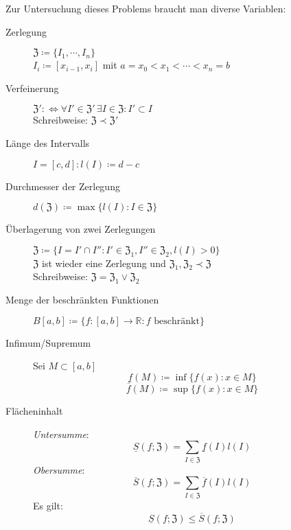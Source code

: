 \documentclass[ngerman,titlepage,twoside, parskip=half*]{scrreprt}
\newcommand*{\R}{\mathbb{R}}
\newcommand*{\ZZ}{\mathfrak{Z}}
\newcommand*{\perdef}{:\Leftrightarrow}
\theoremstyle{plain}
\theoremstyle{definition}
\theoremstyle{remark}
\begin{document}
Zur Untersuchung dieses Problems braucht man diverse Variablen:
\begin{description}
  \item[Zerlegung] $\ZZ\coloneqq\{I_1,\cdots,I_n\}$\\
    $I_i\coloneqq[x_{i-1},x_i]$ mit $a=x_0<x_1<\cdots<x_n=b$
  \item[Verfeinerung] $\ZZ'\perdef\forall
    I'\in\ZZ'\,\exists I\in\ZZ\colon I'\subset I$\\
    Schreibweise: $\ZZ\prec\ZZ'$
  \item[Länge des Intervalls] $I=[c,d]\colon l(I)\coloneqq d-c$
  \item[Durchmesser der Zerlegung] $d(\ZZ)\coloneqq\max\{l(I)\colon
    I\in\ZZ\}$
  \item[Überlagerung von zwei Zerlegungen] $\ZZ\coloneqq\{I=I'\cap I''\colon
    I'\in\ZZ_1, I''\in\ZZ_2, l(I)>0\}$\\
    $\ZZ$ ist wieder eine Zerlegung und $\ZZ_1,\ZZ_2\prec\ZZ$\\
    Schreibweise: $\ZZ=\ZZ_1\vee\ZZ_2$
  \item[Menge der beschränkten Funktionen] $B[a,b]\coloneqq\{f\colon
    [a,b]\rightarrow\R\colon f\text{ beschränkt}\}$
  \item[Infimum/Supremum]
    Sei $M\subset[a,b]$\\
    \[\underline{f}(M)\coloneqq\inf\{f(x)\colon x\in M\}\]
    \[\overline{f}(M)\coloneqq\sup\{f(x)\colon x\in M\}\]
  \item[Flächeninhalt]
    \emph{Untersumme}:
    \[\underline{S}(f;\ZZ)=\sum_{I\in\ZZ}\underline{f}(I)l(I)\]
    \emph{Obersumme}:
    \[\overline{S}(f;\ZZ)=\sum_{I\in\ZZ}\overline{f}(I)l(I)\]
    Es gilt:
    \[\underline{S}(f;\ZZ)\leq\overline{S}(f;\ZZ)\]
\end{description}
\end{document}
